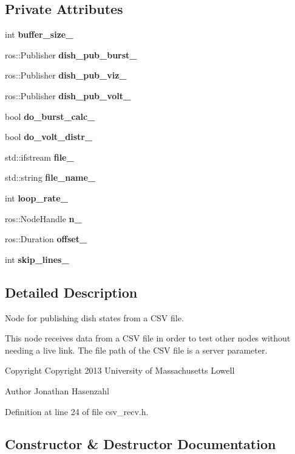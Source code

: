 \subsection*{\-Private \-Attributes}
\begin{DoxyCompactItemize}
\item 
int {\bf buffer\-\_\-size\-\_\-}
\item 
ros\-::\-Publisher {\bf dish\-\_\-pub\-\_\-burst\-\_\-}
\item 
ros\-::\-Publisher {\bf dish\-\_\-pub\-\_\-viz\-\_\-}
\item 
ros\-::\-Publisher {\bf dish\-\_\-pub\-\_\-volt\-\_\-}
\item 
bool {\bf do\-\_\-burst\-\_\-calc\-\_\-}
\item 
bool {\bf do\-\_\-volt\-\_\-distr\-\_\-}
\item 
std\-::ifstream {\bf file\-\_\-}
\item 
std\-::string {\bf file\-\_\-name\-\_\-}
\item 
int {\bf loop\-\_\-rate\-\_\-}
\item 
ros\-::\-Node\-Handle {\bf n\-\_\-}
\item 
ros\-::\-Duration {\bf offset\-\_\-}
\item 
int {\bf skip\-\_\-lines\-\_\-}
\end{DoxyCompactItemize}


\subsection{\-Detailed \-Description}
\-Node for publishing dish states from a \-C\-S\-V file. 

\-This node receives data from a \-C\-S\-V file in order to test other nodes without needing a live link. \-The file path of the \-C\-S\-V file is a server parameter.

\begin{DoxyCopyright}{\-Copyright}
\-Copyright 2013 \-University of \-Massachusetts \-Lowell 
\end{DoxyCopyright}
\begin{DoxyAuthor}{\-Author}
\-Jonathan \-Hasenzahl 
\end{DoxyAuthor}


\-Definition at line 24 of file csv\-\_\-recv.\-h.



\subsection{\-Constructor \& \-Destructor \-Documentation}

